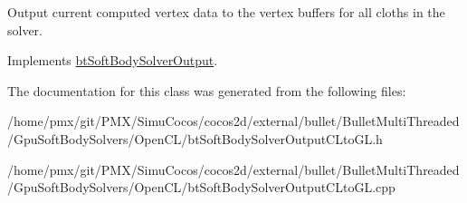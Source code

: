 Output current computed vertex data to the vertex buffers for all cloths in the solver. 

Implements \hyperlink{classbtSoftBodySolverOutput_a7c3761747267f87da347aad276218663}{bt\+Soft\+Body\+Solver\+Output}.



The documentation for this class was generated from the following files\+:\begin{DoxyCompactItemize}
\item 
/home/pmx/git/\+P\+M\+X/\+Simu\+Cocos/cocos2d/external/bullet/\+Bullet\+Multi\+Threaded/\+Gpu\+Soft\+Body\+Solvers/\+Open\+C\+L/bt\+Soft\+Body\+Solver\+Output\+C\+Lto\+G\+L.\+h\item 
/home/pmx/git/\+P\+M\+X/\+Simu\+Cocos/cocos2d/external/bullet/\+Bullet\+Multi\+Threaded/\+Gpu\+Soft\+Body\+Solvers/\+Open\+C\+L/bt\+Soft\+Body\+Solver\+Output\+C\+Lto\+G\+L.\+cpp\end{DoxyCompactItemize}
